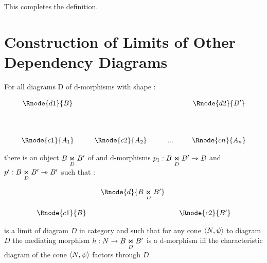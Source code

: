 \documentclass[10pt,a4paper]{scrartcl}
\begin{document}
\noindent This completes the definition.



\section{Construction of Limits of Other Dependency Diagrams}

\begin{lemma}
For all diagrams D of d-morphisms with shape \ndidly:
	
\begin{center}
\begin{displaymath}
\begin{array}{cp{0.3cm}c         p{0.3cm}  c p{0.2cm} c}
\Rnode{d1}{B}& &               & &     & &\Rnode{d2}{B'}  \\ [1.4cm]
\Rnode{c1}{A_1}& &\Rnode{c2}{A_2}& & ... & &\Rnode{cn}{A_n}
\end{array}
\end{displaymath}
\end{center}

there is an object  $ \fibrex{B}{B'}{D}$ of  and d-morphisms 
$p_1: \fibrex{B}{B'}{D} \smorph B$ and  $p': \fibrex{B}{B'}{D} \smorph B'$ such that :

\begin{center}
\begin{displaymath}
\begin{array}{cp{0cm}cp{0cm} c}
            & &\Rnode{d}{\fibrex{B}{B'}{D}}                  \\ [0.6cm]
\Rnode{c1}{B}& &                & & \Rnode{c2}{B'} 
\end{array}
\end{displaymath}
\end{center}

is a limit of diagram $D$ in category  and such that for any cone $\tuple{N,\psi}$ to diagram $D$
the mediating morphism $h: N \morph B \underset{D}{\Join} B'$ is a d-morphism iff 
the characteristic diagram of the cone $\tuple{N,\psi}$ factors through $D$.

\end{lemma}
\end{document}
